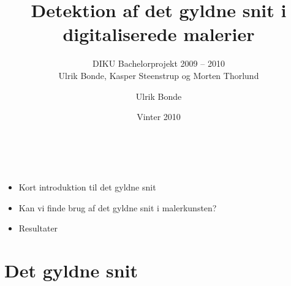 \documentclass{beamer}
\title{\huge{Detektion af det gyldne snit i digitaliserede malerier}}
\subtitle{DIKU Bachelorprojekt 2009 -- 2010\\{\tiny Ulrik Bonde, Kasper Steenstrup og Morten Thorlund}}
\author{Ulrik Bonde}
\date{Vinter 2010}
\begin{document}
\begin{frame}
    \titlepage
\end{frame}

\section[Oversigt]{}
\begin{frame}

    \frametitle{\ }

    \begin{itemize}
        \item Kort introduktion til det gyldne snit
        \item Kan vi finde brug af det gyldne snit i malerkunsten?
        \item Resultater
    \end{itemize}

\end{frame}

\section{Det gyldne snit}
\subsection*{}
\end{document}
